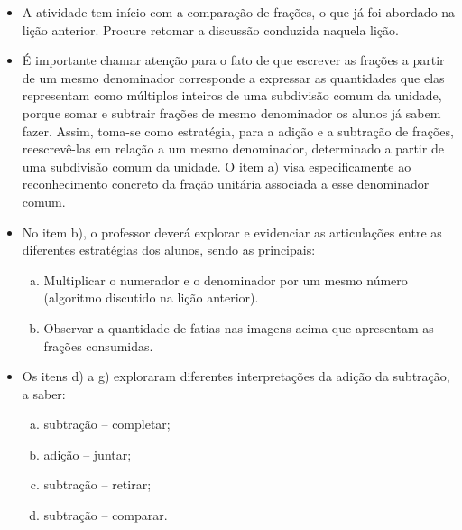 \begin{multicols}{2}
\begin{itemize}
   \item  A atividade tem início com a comparação de frações, o que já foi abordado na lição anterior. Procure retomar a discussão conduzida naquela lição.
   \item  É importante chamar atenção para o fato de que escrever as frações a partir de um mesmo denominador corresponde a expressar as quantidades que elas representam como múltiplos inteiros de uma subdivisão comum da unidade, porque somar e subtrair frações de mesmo denominador os alunos já sabem fazer. Assim, toma-se como estratégia, para a adição e a subtração de frações, reescrevê-las em relação a um mesmo denominador, determinado a partir de uma subdivisão comum da unidade. O item a) visa especificamente ao reconhecimento concreto da fração unitária associada a esse denominador comum.
   \item  No item b), o professor deverá explorar e evidenciar as articulações entre as diferentes estratégias dos alunos, sendo as principais:
   \begin{enumerate}[a)]
   \item  Multiplicar o numerador e o denominador por um mesmo número (algoritmo discutido na lição anterior).
   \item  Observar a quantidade de fatias nas imagens acima que apresentam as frações consumidas.
   \end{enumerate}
   \item  Os itens d) a g) exploraram diferentes interpretações da adição da subtração, a saber:
   \begin{enumerate}[a)]
\item subtração – completar;
\item adição – juntar;
\item subtração – retirar;
\item subtração – comparar.
   \end{enumerate}

 \end{itemize}
\end{multicols}


